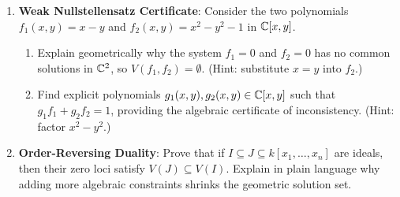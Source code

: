 \begin{enumerate}
  \item \textbf{Weak Nullstellensatz Certificate}: Consider the two polynomials $f_1(x, y) = x - y$ and $f_2(x, y) = x^2 - y^2 - 1$ in $\mathbb{C}[x, y]$.
  \begin{enumerate}
    \item Explain geometrically why the system $f_1 = 0$ and $f_2 = 0$ has no common solutions in $\mathbb{C}^2$, so $V(f_1, f_2) = \emptyset$. (Hint: substitute $x = y$ into $f_2$.)
    \item Find explicit polynomials $g_1(x, y), g_2(x, y) \in \mathbb{C}[x, y]$ such that $g_1 f_1 + g_2 f_2 = 1$, providing the algebraic certificate of inconsistency. (Hint: factor $x^2 - y^2$.)
  \end{enumerate}
  \item \textbf{Order-Reversing Duality}: Prove that if $I \subseteq J \subseteq k[x_1, \dots, x_n]$ are ideals, then their zero loci satisfy $V(J) \subseteq V(I)$. Explain in plain language why adding more algebraic constraints shrinks the geometric solution set.
\end{enumerate}

\newpage
